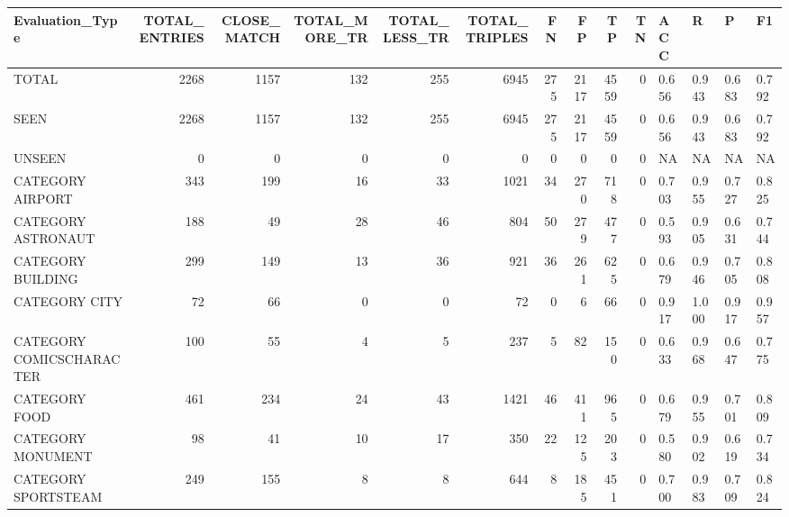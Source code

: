 \begin{tabular}{lrrrrrrrrrllll}
\hline
 Evaluation\_Type          &   TOTAL\_ENTRIES &   CLOSE\_MATCH &   TOTAL\_MORE\_TR &   TOTAL\_LESS\_TR &   TOTAL\_TRIPLES &   FN &   FP &   TP &   TN & ACC   & R     & P     & F1    \\
\hline
 TOTAL                    &            2268 &          1157 &             132 &             255 &            6945 &  275 & 2117 & 4559 &    0 & 0.656 & 0.943 & 0.683 & 0.792 \\
 SEEN                     &            2268 &          1157 &             132 &             255 &            6945 &  275 & 2117 & 4559 &    0 & 0.656 & 0.943 & 0.683 & 0.792 \\
 UNSEEN                   &               0 &             0 &               0 &               0 &               0 &    0 &    0 &    0 &    0 & NA    & NA    & NA    & NA    \\
 CATEGORY AIRPORT         &             343 &           199 &              16 &              33 &            1021 &   34 &  270 &  718 &    0 & 0.703 & 0.955 & 0.727 & 0.825 \\
 CATEGORY ASTRONAUT       &             188 &            49 &              28 &              46 &             804 &   50 &  279 &  477 &    0 & 0.593 & 0.905 & 0.631 & 0.744 \\
 CATEGORY BUILDING        &             299 &           149 &              13 &              36 &             921 &   36 &  261 &  625 &    0 & 0.679 & 0.946 & 0.705 & 0.808 \\
 CATEGORY CITY            &              72 &            66 &               0 &               0 &              72 &    0 &    6 &   66 &    0 & 0.917 & 1.000 & 0.917 & 0.957 \\
 CATEGORY COMICSCHARACTER &             100 &            55 &               4 &               5 &             237 &    5 &   82 &  150 &    0 & 0.633 & 0.968 & 0.647 & 0.775 \\
 CATEGORY FOOD            &             461 &           234 &              24 &              43 &            1421 &   46 &  411 &  965 &    0 & 0.679 & 0.955 & 0.701 & 0.809 \\
 CATEGORY MONUMENT        &              98 &            41 &              10 &              17 &             350 &   22 &  125 &  203 &    0 & 0.580 & 0.902 & 0.619 & 0.734 \\
 CATEGORY SPORTSTEAM      &             249 &           155 &               8 &               8 &             644 &    8 &  185 &  451 &    0 & 0.700 & 0.983 & 0.709 & 0.824 \\

\end{tabular}
